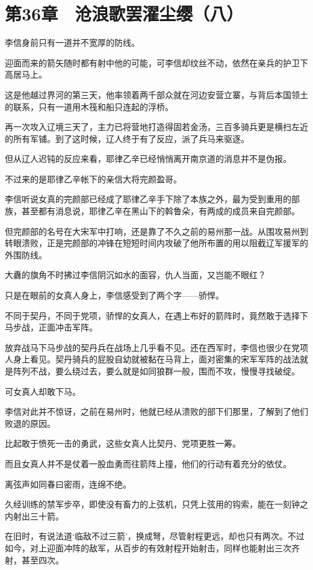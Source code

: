 \section{第36章　沧浪歌罢濯尘缨（八）}

李信身前只有一道并不宽厚的防线。

迎面而来的箭矢随时都有射中他的可能，可李信却纹丝不动，依然在亲兵的护卫下高居马上。

这是他越过界河的第三天，他率领着两千部众就在河边安营立寨，与背后本国领土的联系，只有一道用木筏和船只连起的浮桥。

再一次攻入辽境三天了，主力已将营地打造得固若金汤，三百多骑兵更是横扫左近的所有军铺。到了这时候，辽人终于有了反应，派了兵马来驱逐。

但从辽人迟钝的反应来看，耶律乙辛已经悄悄离开南京道的消息并不是伪报。

不过来的是耶律乙辛帐下的亲信大将完颜盈哥。

李信听说女真的完颜部已经成了耶律乙辛手下除了本族之外，最为受到重用的部族，甚至都有消息说，耶律乙辛在黑山下的斡鲁朵，有两成的成员来自完颜部。

但完颜部的名号在大宋军中打响，还是靠了不久之前的易州那一战。从围攻易州到转眼溃败，正是完颜部的冲锋在短短时间内攻破了他所布置的用以阻截辽军援军的外围防线。

大纛的旗角不时拂过李信阴沉如水的面容，仇人当面，又岂能不眼红？

只是在眼前的女真人身上，李信感受到了两个字——骄悍。

不同于契丹，不同于党项，骄悍的女真人，在遇上布好的箭阵时，竟然敢于选择下马步战，正面冲击军阵。

放弃战马下马步战的契丹兵在战场上几乎看不见。还在西军时，李信也很少在党项人身上看见。契丹骑兵的屁股自幼就被黏在马背上，面对密集的宋军军阵的战法就是阵列不战，要么绕过去，要么就是如同狼群一般，围而不攻，慢慢寻找破绽。

可女真人却敢下马。

李信对此并不惊讶，之前在易州时，他就已经从溃败的部下们那里，了解到了他们败退的原因。

比起敢于愤死一击的勇武，这些女真人比契丹、党项更胜一筹。

而且女真人并不是仗着一股血勇而往箭阵上撞，他们的行动有着充分的依仗。

离弦声如同春曰密雨，连绵不绝。

久经训练的禁军步卒，即使没有畜力的上弦机，只凭上弦用的钩索，能在一刻钟之内射出三十箭。

在旧时，有说法道‘临敌不过三箭’，换成弩，尽管射程更远，却也只有两次。不过如今，对上迎面冲阵的敌军，从百步的有效射程开始射击，同样也能射出三次齐射，甚至四次。

